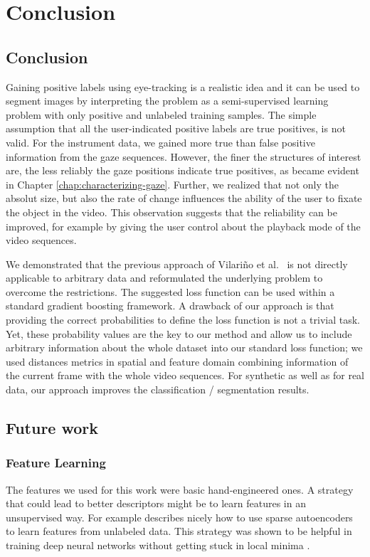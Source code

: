 \chapter{Conclusion}
\label{chap:conclusion}
\section{Conclusion}
Gaining positive labels using eye-tracking is a realistic idea and it can be used to segment images by interpreting the problem as a semi-supervised learning problem with only positive and unlabeled training samples. The simple assumption that all the user-indicated positive labels are true positives, is not valid. For the instrument data, we gained more true than false positive information from the gaze sequences. However, the finer the structures of interest are, the less reliably the gaze positions indicate true positives, as became evident in Chapter \ref{chap:characterizing-gaze}. Further, we realized that not only the absolut size, but also the rate of change influences the ability of the user to fixate the object in the video. This observation suggests that the reliability can be improved, for example by giving the user control about the playback mode of the video sequences.

We demonstrated that the previous approach of Vilari\~no et al.\ \cite{vilarino2007automatic} is not directly applicable to arbitrary data and reformulated the underlying problem to overcome the restrictions. 
The suggested loss function can be used within a standard gradient boosting framework. 
A drawback of our approach is that providing the correct probabilities to define the loss function is not a trivial task. Yet, these probability values are the key to our method and allow us to include arbitrary information about the whole dataset into our standard loss function; we used distances metrics in spatial and feature domain combining information of the current frame with the whole video sequences. For synthetic as well as for real data, our approach improves the classification / segmentation results.

\section{Future work}

\subsection{Feature Learning}
The features we used for this work were basic hand-engineered ones. 
A strategy that could lead to better descriptors might be to learn features in an unsupervised way. 
For example \cite{ng2011sparse} describes nicely how to use sparse autoencoders to learn features from unlabeled data. This strategy was shown to be helpful in training deep neural networks without getting stuck in local minima \cite{bengio2007greedy}.

